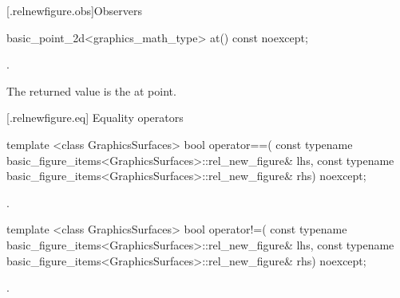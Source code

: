 [\iotwod.relnewfigure.obs]{Observers}%

%
\begin{itemdecl}
basic_point_2d<graphics_math_type> at() const noexcept;
\end{itemdecl}
\begin{itemdescr}
\pnum
\returns {}.

\pnum
\remarks
The returned value is the at point.
\end{itemdescr}

 [\iotwod.relnewfigure.eq] {Equality operators}%

%
\begin{itemdecl}
template <class GraphicsSurfaces>
bool operator==(
  const typename basic_figure_items<GraphicsSurfaces>::rel_new_figure& lhs,
  const typename basic_figure_items<GraphicsSurfaces>::rel_new_figure& rhs)
  noexcept;
\end{itemdecl}
\begin{itemdescr}
\pnum
\returns {}.
\end{itemdescr}

%
\begin{itemdecl}
template <class GraphicsSurfaces>
bool operator!=(
  const typename basic_figure_items<GraphicsSurfaces>::rel_new_figure& lhs,
  const typename basic_figure_items<GraphicsSurfaces>::rel_new_figure& rhs) 
  noexcept;
\end{itemdecl}
\begin{itemdescr}
\pnum
\returns {}.
\end{itemdescr}
